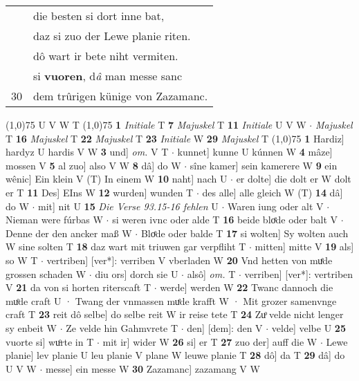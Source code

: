 \documentclass[8pt,a4paper,notitlepage]{article}
\begin{document}
\begin{table}[ht]
\begin{minipage}[t]{0.5\linewidth}
\begin{tabular}{rl}
 & die besten si dort inne bat,\\ 
 & daz si zuo der Lewe planie riten.\\ 
 & dô wart ir bete niht vermiten.\\ 
 & si \textbf{vuoren}, d\textit{â} man messe sanc\\ 
30 & dem trûrigen künige von Zazamanc.\\ 
\end{tabular}
\scriptsize
\line(1,0){75} \newline
U V W T \newline
\line(1,0){75} \newline
\textbf{1} \textit{Initiale} T  \textbf{7} \textit{Majuskel} T  \textbf{11} \textit{Initiale} U V W   $\cdot$ \textit{Majuskel} T  \textbf{16} \textit{Majuskel} T  \textbf{22} \textit{Majuskel} T  \textbf{23} \textit{Initiale} W  \textbf{29} \textit{Majuskel} T  \newline
\line(1,0){75} \newline
\textbf{1} Hardiz] hardyz U hardis V W \textbf{3} und] \textit{om.} V T  $\cdot$ kunnet] kunne U kúnnen W \textbf{4} mâze] mossen V \textbf{5} al zuo] also V W \textbf{8} dâ] do W  $\cdot$ sîne kamer] sein kamerere W \textbf{9} ein wênic] Ein klein V (T) In einem W \textbf{10} naht] nach U  $\cdot$ er dolte] die dolt er W dolt er T \textbf{11} Des] EIns W \textbf{12} wurden] wunden T  $\cdot$ des alle] alle gleich W (T) \textbf{14} dâ] do W  $\cdot$ mit] nit U \textbf{15} \textit{Die Verse 93.15-16 fehlen} U   $\cdot$ Waren iung oder alt V  $\cdot$ Nieman were fúrbas W  $\cdot$ si weren ivnc oder alde T \textbf{16} beide bloͤde oder balt V  $\cdot$ Denne der den ancker maß W  $\cdot$ Bloͤde oder balde T \textbf{17} si wolten] Sy wolten auch W sine solten T \textbf{18} daz wart mit triuwen gar verpfliht T  $\cdot$ mitten] mitte V \textbf{19} als] so W T  $\cdot$ vertriben] [ver*]: verriben V vberladen W \textbf{20} Vnd hetten von muͤde grossen schaden W  $\cdot$ diu ors] dorch sie U  $\cdot$ alsô] \textit{om.} T  $\cdot$ verriben] [ver*]: vertriben V \textbf{21} da von si horten riterscaft T  $\cdot$ werde] werden W \textbf{22} Twanc dannoch die muͦde craft U · Twang der vnmassen muͤde krafft W · Mit grozer samenvnge craft T \textbf{23} reit dô selbe] do selbe reit W ir reise tete T \textbf{24} Zuͦ velde nicht lenger sy enbeit W  $\cdot$ Ze velde hin Gahmvrete T  $\cdot$ den] [dem]: den V  $\cdot$ velde] velbe U \textbf{25} vuorte si] wuͦrte in T  $\cdot$ mit ir] wider W \textbf{26} si] er T \textbf{27} zuo der] auff die W  $\cdot$ Lewe planie] lev planie U leu planie V plane W leuwe planie T \textbf{28} dô] da T \textbf{29} dâ] do U V W  $\cdot$ messe] ein messe W \textbf{30} Zazamanc] zazamang V W \newline
\end{minipage}
\end{table}
\end{document}
